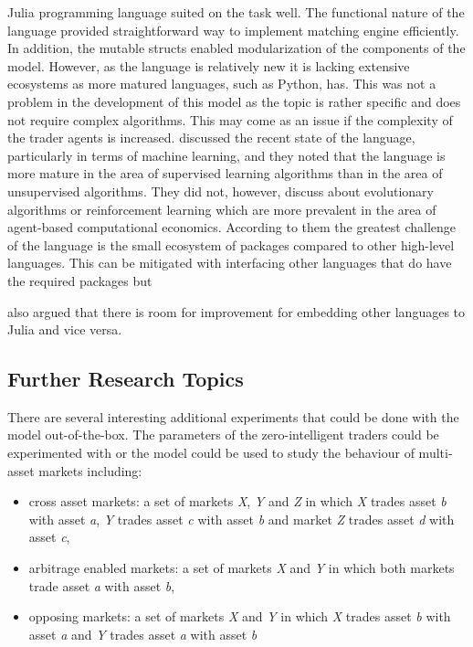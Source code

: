 Julia programming language suited on the task well. The functional nature
of the language provided straightforward way to implement matching engine
efficiently. In addition, the mutable structs enabled modularization of the
components of the model. However, as the language is relatively new it is
lacking extensive ecosystems as more matured languages, such as Python,
has. This was not a problem in the development of this model as the topic is 
rather specific and does not require complex algorithms. This may come as an
issue if the complexity of the trader agents is increased. \citet{JuliaML2020} 
discussed the recent state of the language, particularly in terms of machine 
learning, and they noted that the language is more mature in the area of
supervised learning algorithms than in the area of unsupervised algorithms.
They did not, however, discuss about evolutionary algorithms or reinforcement
learning which are more prevalent in the area of agent-based computational economics.
According to them the greatest challenge of the language is the small ecosystem
of packages compared to other high-level languages. This can be mitigated
with interfacing other languages that do have the required packages but 
\author{JuliaML2020} also argued that there is room for improvement for embedding
other languages to Julia and vice versa.

\subsection{Further Research Topics}
There are several interesting additional experiments that could be done with
the model out-of-the-box. The parameters of the zero-intelligent traders could
be experimented with or the model could be used to study the behaviour of 
multi-asset markets including:
\begin{itemize}
    \item cross asset markets: a set of markets \emph{X}, \emph{Y} and \emph{Z} 
        in which \emph{X} trades asset \emph{b} with asset \emph{a}, 
        \emph{Y} trades asset \emph{c} with asset \emph{b} 
        and market \emph{Z} trades asset \emph{d} with asset \emph{c},
    \item arbitrage enabled markets: a set of markets \emph{X} and \emph{Y} 
        in which both markets trade asset \emph{a} with asset \emph{b},
    \item opposing markets: a set of markets \emph{X} and \emph{Y} 
        in which \emph{X} trades asset \emph{b} with asset \emph{a} 
        and \emph{Y} trades asset \emph{a} with asset \emph{b}
\end{itemize}

